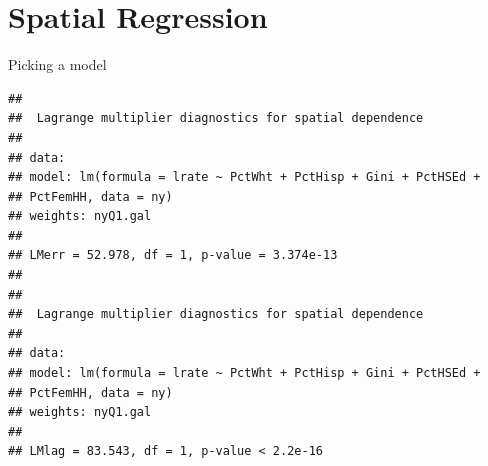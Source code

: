 \documentclass[aspectratio = 169, 12pt]{beamer}\usepackage[]{graphicx}\usepackage[]{color}
\makeatletter
\newenvironment{kframe}{%
 \def\at@end@of@kframe{}%
 \ifinner\ifhmode%
  \def\at@end@of@kframe{\end{minipage}}%
  \begin{minipage}{\columnwidth}%
 \fi\fi%
 \def\FrameCommand##1{\hskip\@totalleftmargin \hskip-\fboxsep
 \colorbox{shadecolor}{##1}\hskip-\fboxsep
     \hskip-\linewidth \hskip-\@totalleftmargin \hskip\columnwidth}%
 \MakeFramed {\advance\hsize-\width
   \@totalleftmargin\z@ \linewidth\hsize
   \@setminipage}}%
 {\par\unskip\endMakeFramed%
 \at@end@of@kframe}
\newenvironment{knitrout}{}{} %
\makeatother
\begin{document}
\section{Spatial Regression}
\begin{frame}[fragile]{Picking a model}
\begin{knitrout}\tiny
{}\color{fgcolor}\begin{kframe}


{\ttfamily\noindent\bfseries\color{errorcolor}{\#\# Error in ogrInfo(dsn = dsn, layer = layer, encoding = encoding, use\_iconv = use\_iconv, : Cannot open data source}}\begin{verbatim}
## 
## 	Lagrange multiplier diagnostics for spatial dependence
## 
## data:  
## model: lm(formula = lrate ~ PctWht + PctHisp + Gini + PctHSEd +
## PctFemHH, data = ny)
## weights: nyQ1.gal
## 
## LMerr = 52.978, df = 1, p-value = 3.374e-13
## 
## 
## 	Lagrange multiplier diagnostics for spatial dependence
## 
## data:  
## model: lm(formula = lrate ~ PctWht + PctHisp + Gini + PctHSEd +
## PctFemHH, data = ny)
## weights: nyQ1.gal
## 
## LMlag = 83.543, df = 1, p-value < 2.2e-16
\end{verbatim}
\end{kframe}
\end{knitrout}
\end{frame}
\end{document}
